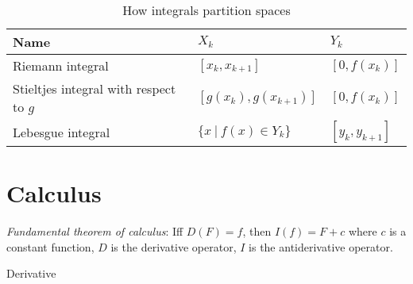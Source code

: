 \begin{table}[h]
    \caption{How integrals partition spaces}
    \label{tab:integral}
    \centering
\begin{tabular}{lll}
    Name & \(X_k\) & \(Y_k\)
    \\
    \hline
    Riemann integral & \( [x_k,x_{k+1}]\) & \( [0,f(x_k)]\)
    \\
    Stieltjes integral with respect to \(g\) & \( [g(x_k),g(x_{k+1})]\) & \( [0,f(x_k)]\)
    \\
    Lebesgue integral & \( \{x ~|~ f(x) \in Y_k\}\) & \( [y_k,y_{k+1}]\)
\end{tabular}
\end{table}

\section{Calculus}

%
\emph{Fundamental theorem of calculus}:
Iff \(D(F) = f\), then \(I(f) = F + c\) where \(c\) is a constant function,
\(D\) is the derivative operator, \(I\) is the antiderivative operator.

Derivative
